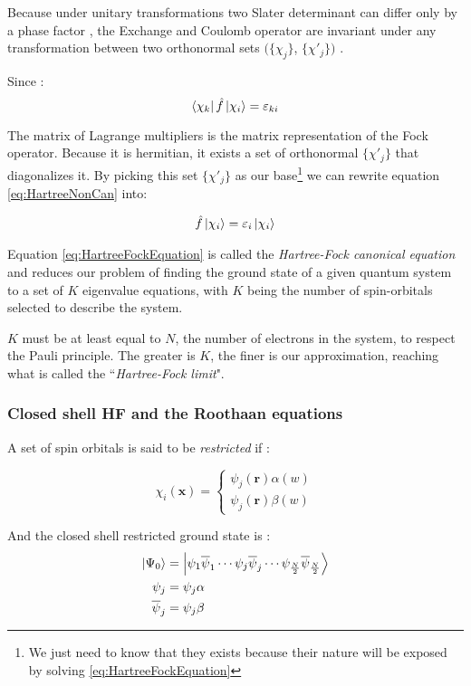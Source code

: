 \documentclass[a4paper,12pt]{article}
\begin{document}
Because under unitary transformations two Slater determinant can differ only by a phase factor \cite[p.120]{Attila}, the Exchange and Coulomb operator are invariant under any transformation between two orthonormal sets $(\{\chi_j\}$, $\{\chi'_j\})$ .

Since :
\begin{equation}
	\bra{\chi_k}\hat{f}\ket{\chi_i} = \varepsilon_{ki}
\end{equation}

The matrix of Lagrange multipliers is the matrix representation of the Fock operator.
Because it is hermitian, it exists a set of orthonormal $\{\chi'_j\}$ that diagonalizes it.
By picking this set $\{\chi'_j\}$ as our base\footnote{We just need to know that they exists because their nature will be exposed by solving \eqref{eq:HartreeFockEquation}} we can rewrite equation \eqref{eq:HartreeNonCan} into:

\begin{align}
	\hat{f} \ket{\chi_i} = \varepsilon_{i} \ket{\chi_{i}} \label{eq:HartreeFockEquation}
\end{align}

Equation \eqref{eq:HartreeFockEquation} is called the \textit{Hartree-Fock canonical equation} and reduces our problem of finding the ground state of a given quantum system to a set of $K$ eigenvalue equations, with $K$ being the number of spin-orbitals selected to describe the system. 

$K$ must be at least equal to $N$, the number of electrons in the system, to respect the Pauli principle. The greater is $K$, the finer is our approximation, reaching what is called the ``\textit{Hartree-Fock limit}".

\subsubsection{Closed shell HF and the Roothaan equations}

A set of spin orbitals is said to be \textit{restricted} if :


\[\chi_{i}(\mathbf{x}) = \left\{
  \begin{array}{lr}
    \psi_{j}(\mathbf{r}) \alpha(w)\\
    \psi_{j}(\mathbf{r}) \beta(w)
  \end{array}
\right.
\]

And the closed shell restricted ground state is :
\begin{align}
	\ket{\Psi_{0}} & = \ket{ \psi_{1} \overline{\psi}_{1} \cdots  
	\psi_{j} \overline{\psi}_{j}
	\cdots	
	\psi_{\frac{N}{2}} \overline{\psi}_{\frac{N}{2}}}
	\\
	\psi_{j} & = \psi_{j} \alpha
	\\
	\overline{\psi}_{j} & = \psi_{j} \beta
\end{align}
\end{document}
